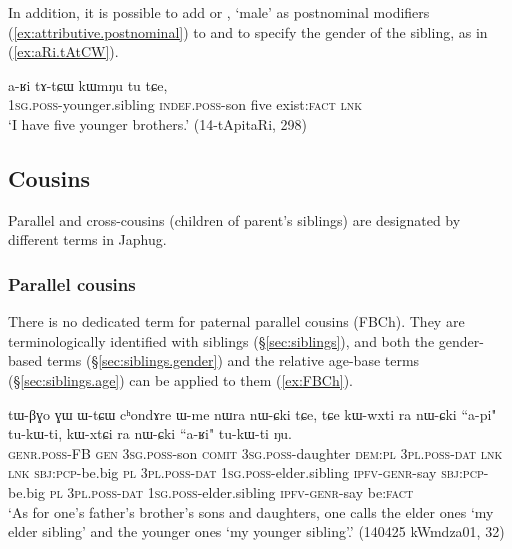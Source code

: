 In addition, it is possible to add  or , `male' as postnominal modifiers (\ref{ex:attributive.postnominal}) to  and  to specify the gender of the sibling, as in (\ref{ex:aRi.tAtCW}).

\begin{exe}
	\ex \label{ex:aRi.tAtCW}
	\gll a-ʁi tɤ-tɕɯ kɯmŋu tu tɕe, \\
	\textsc{1sg}.\textsc{poss}-younger.sibling \textsc{indef}.\textsc{poss}-son five exist:\textsc{fact} \textsc{lnk} \\
	\glt `I have five younger brothers.' (14-tApitaRi, 298)
\end{exe}

  
                   
\subsection{Cousins} \label{sec:ego.cousins}
Parallel and cross-cousins (children of parent's siblings) are designated by different terms in Japhug.

\subsubsection{Parallel cousins} \label{sec:ego.parallel.cousins}
There is no dedicated term for paternal parallel cousins (FBCh). They are terminologically identified with siblings (§\ref{sec:siblings}), and both the gender-based terms (§\ref{sec:siblings.gender}) and the relative age-base terms (§\ref{sec:siblings.age}) can be applied to them (\ref{ex:FBCh}).

\begin{exe}
\ex \label{ex:FBCh}
\gll  tɯ-βɣo ɣɯ ɯ-tɕɯ cʰondɤre ɯ-me nɯra nɯ-ɕki tɕe, tɕe kɯ-wxti ra nɯ-ɕki ``a-pi" tu-kɯ-ti, kɯ-xtɕi ra nɯ-ɕki ``a-ʁi" tu-kɯ-ti ŋu. \\
\textsc{genr}.\textsc{poss}-FB \textsc{gen} \textsc{3sg}.\textsc{poss}-son \textsc{comit}  \textsc{3sg}.\textsc{poss}-daughter \textsc{dem}:\textsc{pl} \textsc{3pl}.\textsc{poss}-\textsc{dat} \textsc{lnk} \textsc{lnk} \textsc{sbj}:\textsc{pcp}-be.big \textsc{pl} \textsc{3pl}.\textsc{poss}-\textsc{dat} \textsc{1sg}.\textsc{poss}-elder.sibling \textsc{ipfv}-\textsc{genr}-say \textsc{sbj}:\textsc{pcp}-be.big \textsc{pl} \textsc{3pl}.\textsc{poss}-\textsc{dat} \textsc{1sg}.\textsc{poss}-elder.sibling \textsc{ipfv}-\textsc{genr}-say be:\textsc{fact} \\
\glt `As for one's father's brother's sons and daughters, one calls the elder ones  `my elder sibling' and the younger ones  `my younger sibling'.' (140425 kWmdza01, 32)
\end{exe}

